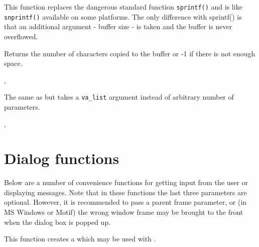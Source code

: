 \label{wxsnprintf}


This function replaces the dangerous standard function {\tt sprintf()} and is
like {\tt snprintf()} available on some platforms. The only difference with
sprintf() is that an additional argument - buffer size - is taken and the
buffer is never overflowed.

Returns the number of characters copied to the buffer or -1 if there is not
enough space.


, 

\label{wxvsnprintf}


The same as  but takes a {\tt va\_list}
argument instead of arbitrary number of parameters.


, 

\section{Dialog functions}\label{dialogfunctions}

Below are a number of convenience functions for getting input from the
user or displaying messages. Note that in these functions the last three
parameters are optional. However, it is recommended to pass a parent frame
parameter, or (in MS Windows or Motif) the wrong window frame may be brought to
the front when the dialog box is popped up.

\label{wxcreatefiletipprovider}


This function creates a  which may be
used with .


